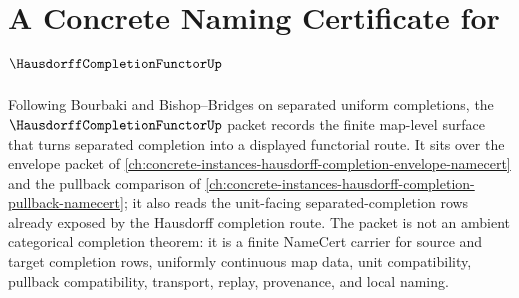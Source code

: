 \chapter{A Concrete Naming Certificate for $\HausdorffCompletionFunctorUp$}
\label{ch:concrete-instances-hausdorff-completion-functor-namecert}

Following Bourbaki and Bishop--Bridges on separated uniform completions, the $\HausdorffCompletionFunctorUp$ packet records the finite map-level surface that turns separated completion into a displayed functorial route. It sits over the envelope packet of \autoref{ch:concrete-instances-hausdorff-completion-envelope-namecert} and the pullback comparison of \autoref{ch:concrete-instances-hausdorff-completion-pullback-namecert}; it also reads the unit-facing separated-completion rows already exposed by the Hausdorff completion route. The packet is not an ambient categorical completion theorem: it is a finite NameCert carrier for source and target completion rows, uniformly continuous map data, unit compatibility, pullback compatibility, transport, replay, provenance, and local naming.

